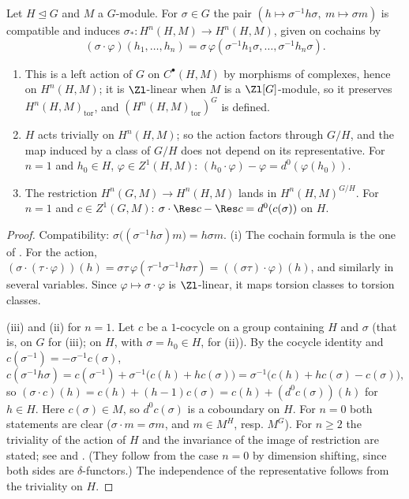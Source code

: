 \begin{proposition}\label{prop:cohomology:conjugation}
Let $H\trianglelefteq G$ and $M$ a $G$-module. For $\sigma\in G$ the pair $(h\mapsto\sigma^{-1}h\sigma,\ m\mapsto\sigma m)$ is compatible and induces
$\sigma_*\colon H^n(H,M)\to H^n(H,M)$, given on cochains by
\[
(\sigma\cdot\varphi)(h_1,\dots,h_n)=\sigma\,\varphi(\sigma^{-1}h_1\sigma,\dots,\sigma^{-1}h_n\sigma).
\]
\begin{enumerate}[label=(\roman*)]
\item This is a left action of $G$ on $C^\bullet(H,M)$ by morphisms of complexes, hence on $H^n(H,M)$; it is $\Zl$-linear when $M$ is a $\Zl[G]$-module, so it
preserves $H^n(H,M)_{\mathrm{tor}}$, and $(H^n(H,M)_{\mathrm{tor}})^{G}$ is defined.
\item $H$ acts trivially on $H^n(H,M)$; so the action factors through $G/H$, and the map induced by a class of $G/H$ does not depend on its representative.
For $n=1$ and $h_0\in H$, $\varphi\in Z^1(H,M)$: $(h_0\cdot\varphi)-\varphi=d^0(\varphi(h_0))$.
\item The restriction $H^n(G,M)\to H^n(H,M)$ lands in $H^n(H,M)^{G/H}$. For $n=1$ and $c\in Z^1(G,M)$: $\sigma\cdot\Res c-\Res c=d^0(c(\sigma))$ on $H$.
\end{enumerate}
\end{proposition}

\begin{proof}
Compatibility: $\sigma\bigl((\sigma^{-1}h\sigma)m\bigr)=h\sigma m$. (i) The cochain formula is the one of . For the action,
$(\sigma\cdot(\tau\cdot\varphi))(h)=\sigma\tau\,\varphi(\tau^{-1}\sigma^{-1}h\sigma\tau)=((\sigma\tau)\cdot\varphi)(h)$, and similarly in several variables. Since $\varphi\mapsto\sigma\cdot\varphi$ is
$\Zl$-linear, it maps torsion classes to torsion classes.

(iii) and (ii) for $n=1$. Let $c$ be a $1$-cocycle on a group containing $H$ and $\sigma$ (that is, on $G$ for (iii); on $H$, with $\sigma=h_0\in H$, for (ii)).
By the cocycle identity and $c(\sigma^{-1})=-\sigma^{-1}c(\sigma)$,
\[
c(\sigma^{-1}h\sigma)=c(\sigma^{-1})+\sigma^{-1}\bigl(c(h)+hc(\sigma)\bigr)=\sigma^{-1}\bigl(c(h)+hc(\sigma)-c(\sigma)\bigr),
\]
so $(\sigma\cdot c)(h)=c(h)+(h-1)c(\sigma)=c(h)+(d^0c(\sigma))(h)$ for $h\in H$. Here $c(\sigma)\in M$, so $d^0c(\sigma)$ is a coboundary on $H$. For $n=0$ both statements are
clear ($\sigma\cdot m=\sigma m$, and $m\in M^H$, resp. $M^G$). For $n\ge2$ the triviality of the action of $H$ and the invariance of the image of restriction
are stated; see \cite[Chapter III, Section 8]{Brown} and \cite[Chapter I, Section 5]{NSW}. (They follow from the case $n=0$ by dimension shifting, since
both sides are $\delta$-functors.) The independence of the representative follows from the triviality on $H$.
\end{proof}


